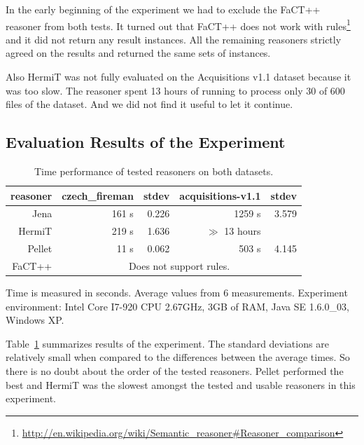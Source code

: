 In the early beginning of the experiment we had to exclude the FaCT++ reasoner from both tests. It turned out that FaCT++ does not work with rules\footnote{\url{http://en.wikipedia.org/wiki/Semantic_reasoner#Reasoner_comparison}} and it did not return any result instances.  All the remaining reasoners strictly agreed on the results and returned the same sets of instances.

Also HermiT was not fully evaluated on the Acquisitions v1.1 dataset because it was too slow. The reasoner spent 13 hours of running to process only 30 of 600 files of the dataset. And we did not find it useful to let it continue.












\subsection{Evaluation Results of the Experiment}






\begin{table}
\begin{center}
\begin{tabular}{|r||r|r||r|r|}
\hline
reasoner & \textbf{czech\_fireman} & stdev & \textbf{acquisitions-v1.1} & stdev\\
\hline
\hline
Jena & 161 s & 0.226 & 1259 s & 3.579\\
\hline
HermiT & 219 s & 1.636 & $\gg$ 13 hours & \\
\hline
Pellet & 11 s & 0.062 & 503 s & 4.145\\
\hline
FaCT++ & \multicolumn{4}{|c|}{Does not support rules.}\\
\hline
\end{tabular}
\end{center}

Time is measured in seconds. Average values from 6 measurements. Experiment environment: Intel Core I7-920 CPU 2.67GHz, 3GB of RAM, Java SE 1.6.0\_03, Windows XP.

\caption{Time performance of tested reasoners on both datasets.}
\label{tab:results}
\end{table}

Table~\ref{tab:results} summarizes results of the experiment. The standard deviations are relatively small when compared to the differences between the average times.  So there is no doubt about the order of the tested reasoners. Pellet performed the best and HermiT was the slowest amongst the tested and usable reasoners in this experiment.

